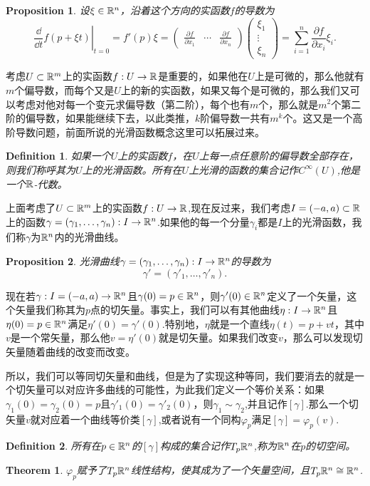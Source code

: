 \documentclass[11pt]{extbook}
\theoremstyle{plain}%
\newtheorem{pro}{Proposition}[section]%
\newtheorem{theo}{Theorem}[section]%
\newtheorem{defi}{Definition}[section]%
\begin{document}
\begin{pro}
设$\xi \in \mathbb{R}^n$，沿着这个方向的实函数$f$的导数为
\[
\left.\frac{\dd}{\dd t}f(p+\xi t)\right|_{t=0}=f'(p)\xi=
\begin{pmatrix}
\frac{\partial f}{\partial x_1}&\cdots&\frac{\partial f}{\partial x_n}
\end{pmatrix}
\begin{pmatrix}
\xi_1\\
\vdots\\
\xi_n
\end{pmatrix}
=\sum_{i=1}^n \frac{\partial f}{\partial x_i}\xi_i.
\]
\end{pro}
考虑$U\subset \mathbb{R}^m$上的实函数$f:U\to \mathbb{R}$是重要的，如果他在$U$上是可微的，那么他就有$m$个偏导数，而每个又是$U$上的新的实函数，如果又每个是可微的，那么我们又可以考虑对他对每一个变元求偏导数（第二阶），每个也有$m$个，那么就是$m^2$个第二阶的偏导数，如果能继续下去，以此类推，$k$阶偏导数一共有$m^k$个。这又是一个高阶导数问题，前面所说的光滑函数概念这里可以拓展过来。
\begin{defi}
	如果一个$U$上的实函数$f$，在$U$上每一点任意阶的偏导数全部存在，则我们称呼其为$U$上的光滑函数。所有在$U$上光滑的函数的集合记作$C^\infty(U)$,他是一个$\mathbb{R}$-代数。
\end{defi}
上面考虑了$U\subset \mathbb{R}^m$上的实函数$f:U\to \mathbb{R}$,现在反过来，我们考虑$I=(-a,a)\subset \mathbb{R}$上的函数$\gamma=(\gamma_1,\dots,\gamma_n):I\to \mathbb{R}^n$.如果他的每一个分量$\gamma_i$都是$I$上的光滑函数，我们称$\gamma$为$\mathbb{R}^n$内的光滑曲线。
\begin{pro}
	光滑曲线$\gamma=(\gamma_1,\dots,\gamma_n):I\to \mathbb{R}^n$的导数为
	\[
		\gamma'=(\gamma'_1,\dots,\gamma'_n).
	\]
\end{pro}
现在若$\gamma:I=(-a,a)\to \mathbb{R}^n$且$\gamma(0)=p\in \mathbb{R}^n$，则$\gamma'(0)\in \mathbb{R}^n$定义了一个矢量，这个矢量我们称其为$p$点的切矢量。事实上，我们可以有其他曲线$\eta:I\to \mathbb{R}^n$且$\eta(0)=p\in \mathbb{R}^n$满足$\eta'(0)=\gamma'(0)$.特别地，$\eta$就是一个直线$\eta(t)=p+vt$，其中$v$是一个常矢量，那么他$v=\eta'(0)$就是切矢量。如果我们改变$v$，那么可以发现切矢量随着曲线的改变而改变。

所以，我们可以等同切矢量和曲线，但是为了实现这种等同，我们要消去的就是一个切矢量可以对应许多曲线的可能性，为此我们定义一个等价关系：如果$\gamma_1(0)=\gamma_2(0)=p$且$\gamma'_1(0)=\gamma'_2(0)$，则$\gamma_1 \sim \gamma_2$,并且记作$\left[\gamma \right]$.那么一个切矢量$v$就对应着一个曲线等价类$\left[\gamma \right]$,或者说有一个同构$\varphi_p$满足$\left[\gamma \right]=\varphi_p\left(v\right)$.

\begin{defi}
	所有在$p\in \mathbb{R}^n$的$[\gamma]$构成的集合记作$T_p\mathbb{R}^n$,称为$\mathbb{R}^n$在$p$的切空间。
\end{defi}
\begin{theo}
	$\varphi_p$赋予了$T_p\mathbb{R}^n$线性结构，使其成为了一个矢量空间，且$T_p\mathbb{R}^n\cong \mathbb{R}^n$.
\end{theo}
\end{document}
